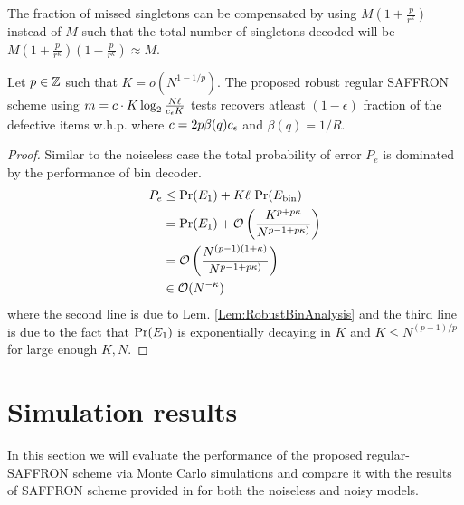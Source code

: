 The fraction of missed singletons can be compensated by using $M(1+\frac{p}{r^{\kappa}})$ instead of $M$ such that the total number of singletons decoded will be $M(1+\frac{p}{r^{\kappa}})(1-\frac{p}{r^{\kappa}})\approx M$.
\begin{theorem}
Let $p\in\mathbb{Z}$ such that $K=o\left(N^{1-1/p}\right)$. The proposed robust regular SAFFRON scheme using $m=c\cdot K \log_{2}\frac{N\ell}{c_{\epsilon} K}$ tests recovers atleast $(1-\epsilon)$ fraction of the defective items w.h.p. where $c=2p\beta(q)c_{\epsilon}$ and $\beta(q)=1/R$. 
%
\end{theorem}
\begin{proof}
Similar to the noiseless case the total probability of error $P_e$ is dominated by the performance of bin decoder. 
\begin{align*}
P_e &\leq  \text{Pr}(E_1)+ K\ell\text{ Pr}(E_{\text{bin}})\\
               &=\text{Pr}(E_1)+ \mathcal{O}\left( \frac{K^{p+p\kappa}}{N^{p-1+p\kappa)}}\right)\\
   			   &= \mathcal{O}\left( \frac{N^{(p-1)(1+\kappa)}}{N^{p-1+p\kappa)}}\right)\\
               &\in \mathcal{O}(N^{-\kappa})
\end{align*}
where the second line is due to Lem. \ref{Lem:RobustBinAnalysis} and the third line is due to the fact that $\text{Pr}(E_1)$ is exponentially decaying in $K$ and $K\leq N^{(p-1)/p}$ for large enough $K,N$.
\end{proof}

\section{Simulation results}
In this section we will evaluate the performance of the proposed regular-SAFFRON scheme via Monte Carlo simulations and compare it with the results of SAFFRON scheme provided in \cite{lee2015saffron} for both the noiseless and noisy models.

